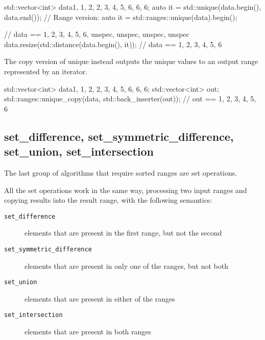 \begin{box-note}
\begin{cppcode}
std::vector<int> data{1, 1, 2, 2, 3, 4, 5, 6, 6, 6};
auto it = std::unique(data.begin(), data.end());
// Range version: auto it = std::ranges::unique(data).begin();

// data == {1, 2, 3, 4, 5, 6, unspec, unspec, unspec, unspec}
data.resize(std::distance(data.begin(), it));
// data == {1, 2, 3, 4, 5, 6}
\end{cppcode}
\end{box-note}



The copy version of unique instead outputs the unique values to an output range represented by an iterator.

\begin{box-note}
\begin{cppcode}
std::vector<int> data{1, 1, 2, 2, 3, 4, 5, 6, 6, 6};
std::vector<int> out;
std::ranges::unique_copy(data, std::back_inserter(out));
// out == {1, 2, 3, 4, 5, 6}
\end{cppcode}
\end{box-note}

\subsection{set\_difference, set\_symmetric\_difference, set\_union, set\_intersection}

The last group of algorithms that require sorted ranges are set operations.


All the set operations work in the same way, processing two input ranges and copying results into the result range, with the following semantics:

\begin{description}
   \item[\texttt{set\_difference}] elements that are present in the first range, but not the second
   \item[\texttt{set\_symmetric\_difference}] elements that are present in only one of the ranges, but not both
   \item[\texttt{set\_union}] elements that are present in either of the ranges
   \item[\texttt{set\_intersection}] elements that are present in both ranges
\end{description}

